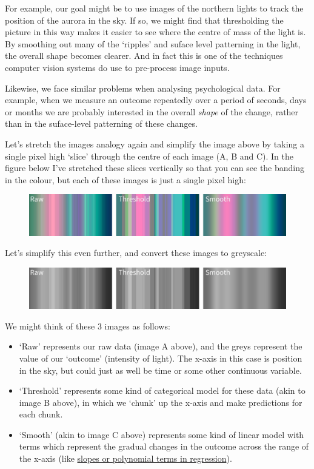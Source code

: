 \documentclass[]{article}
\theoremstyle{definition}
\theoremstyle{definition}
\theoremstyle{definition}
\theoremstyle{remark}
\begin{document}
For example, our goal might be to use images of the northern lights to
track the position of the aurora in the sky. If so, we might find that
thresholding the picture in this way makes it easier to see where the
centre of mass of the light is. By smoothing out many of the `ripples'
and suface level patterning in the light, the overall shape becomes
clearer. And in fact this is one of the techniques computer vision
systems do use to pre-process image inputs.

Likewise, we face similar problems when analysing psychological data.
For example, when we measure an outcome repeatedly over a period of
seconds, days or months we are probably interested in the overall
\emph{shape} of the change, rather than in the suface-level patterning
of these changes.

Let's stretch the images analogy again and simplify the image above by
taking a single pixel high `slice' through the centre of each image (A,
B and C). In the figure below I've stretched these slices vertically so
that you can see the banding in the colour, but each of these images is
just a single pixel high:

\begin{figure}
\centering
\includegraphics{media/aurora-1-px.jpg}
\caption{}
\end{figure}

Let's simplify this even further, and convert these images to greyscale:

\begin{figure}
\centering
\includegraphics{media/aurora-1-px-grey.jpg}
\caption{}
\end{figure}

We might think of these 3 images as follows:

\begin{itemize}
\item
  `Raw' represents our raw data (image A above), and the greys represent
  the value of our `outcome' (intensity of light). The x-axis in this
  case is position in the sky, but could just as well be time or some
  other continuous variable.
\item
  `Threshold' represents some kind of categorical model for these data
  (akin to image B above), in which we `chunk' up the x-axis and make
  predictions for each chunk.
\item
  `Smooth' (akin to image C above) represents some kind of linear model
  with terms which represent the gradual changes in the outcome across
  the range of the x-axis (like \protect\hyperlink{polynomials}{slopes
  or polynomial terms in regression}).
\end{itemize}
\end{document}
